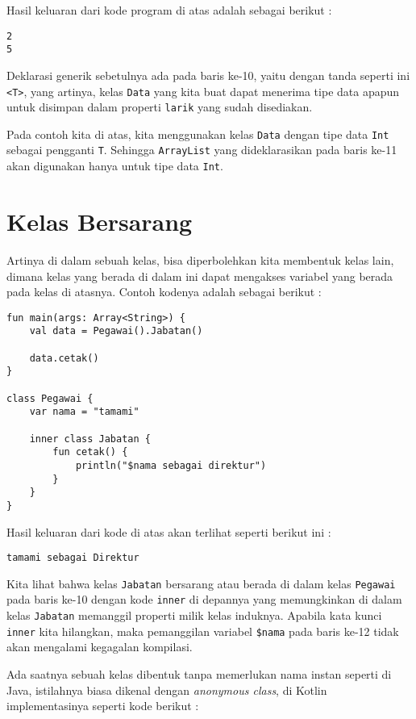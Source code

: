 Hasil keluaran dari kode program di atas adalah sebagai berikut :

\begin{lstlisting}
2
5
\end{lstlisting}

Deklarasi generik sebetulnya ada pada baris ke-10, yaitu dengan tanda seperti ini \texttt{<T>}, yang artinya, kelas \texttt{Data} yang kita buat dapat menerima tipe data apapun untuk disimpan dalam properti \texttt{larik} yang sudah disediakan.

Pada contoh kita di atas, kita menggunakan kelas \texttt{Data} dengan tipe data \texttt{Int} sebagai pengganti \texttt{T}. Sehingga \texttt{ArrayList} yang dideklarasikan pada baris ke-11 akan digunakan hanya untuk tipe data \texttt{Int}.

\section{Kelas Bersarang}

Artinya di dalam sebuah kelas, bisa diperbolehkan kita membentuk kelas lain, dimana kelas yang berada di dalam ini dapat mengakses variabel yang berada pada kelas di atasnya. Contoh kodenya adalah sebagai berikut :

\begin{lstlisting}
fun main(args: Array<String>) {
	val data = Pegawai().Jabatan()
	
	data.cetak()
}

class Pegawai {
	var nama = "tamami"
	
	inner class Jabatan {
		fun cetak() {
			println("$nama sebagai direktur")
		}
	}
}
\end{lstlisting}

Hasil keluaran dari kode di atas akan terlihat seperti berikut ini :

\begin{lstlisting}
tamami sebagai Direktur
\end{lstlisting}

Kita lihat bahwa kelas \texttt{Jabatan} bersarang atau berada di dalam kelas \texttt{Pegawai} pada baris ke-10 dengan kode \texttt{inner} di depannya yang memungkinkan di dalam kelas \texttt{Jabatan} memanggil properti milik kelas induknya. Apabila kata kunci \texttt{inner} kita hilangkan, maka pemanggilan variabel \texttt{\$nama} pada baris ke-12 tidak akan mengalami kegagalan kompilasi.

Ada saatnya sebuah kelas dibentuk tanpa memerlukan nama instan seperti di Java, istilahnya biasa dikenal dengan \textit{anonymous class}, di Kotlin implementasinya seperti kode berikut :

